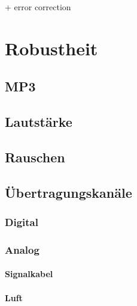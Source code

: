 + error correction

\section{Robustheit}

\subsection{MP3}

\subsection{Lautstärke}

\subsection{Rauschen}

\subsection{Übertragungskanäle}

\subsubsection{Digital}

\subsubsection{Analog}

\paragraph{Signalkabel}

\paragraph{Luft}






